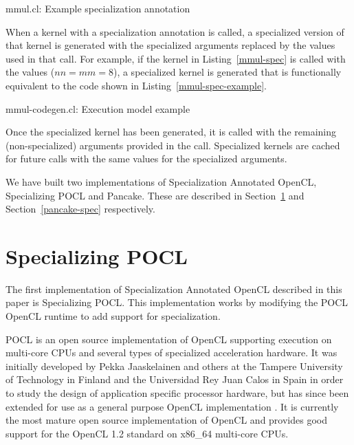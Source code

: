 \documentclass{acm_proc_article-sp}
\newcommand{\includecode}[2][C]{
    }
\begin{document}
\begin{listing}
\includecode{mmul-spec.cl}
\caption{mmul.cl: Example specialization annotation}
\label{mmul-spec}
\end{listing}

When a kernel with a specialization annotation is called, a specialized version
of that kernel is generated with the specialized arguments replaced by the values
used in that call. For example, if the kernel in Listing~\ref{mmul-spec} is called
with the values ($nn = mm = 8$), a specialized kernel is generated that is
functionally equivalent to the code shown in Listing~\ref{mmul-spec-example}.

\begin{listing}
\includecode{mmul-spec-example.cl}
\caption{mmul-codegen.cl: Execution model example}
\label{mmul-spec-example}
\end{listing}

Once the specialized kernel has been generated, it is called with the remaining
(non-specialized) arguments provided in the call. Specialized kernels are
cached for future calls with the same values for the specialized arguments.

We have built two implementations of Specialization Annotated OpenCL,
Specializing POCL and Pancake. These are described in Section~\ref{pocl-spec}
and Section~\ref{pancake-spec} respectively.

\section{Specializing POCL}
\label{pocl-spec}

The first implementation of Specialization Annotated OpenCL described in this
paper is Specializing POCL. This implementation works by modifying the POCL
OpenCL runtime to add support for specialization. 

POCL is an open source implementation of OpenCL supporting execution on
multi-core CPUs and several types of specialized acceleration hardware. It was
initially developed by Pekka Jaaskelainen and others at the Tampere University
of Technology in Finland and the Universidad Rey Juan Calos in Spain in order
to study the design of application specific processor hardware, but has since
been extended for use as a general purpose OpenCL implementation
\cite{Jaaskelainen:2010:POCL}. It is currently the most mature open source
implementation of OpenCL and provides good support for the OpenCL 1.2 standard
on x86\_64 multi-core CPUs.
\end{document}
